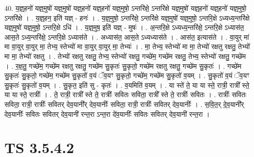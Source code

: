 \documentclass[17pt]{extarticle}
\begin{document}
40. य॒ज्ञ्॒हनो॑ यज्ञ्॒मुषो॑ यज्ञ्॒मुषो॑ यज्ञ्॒हनो॑ यज्ञ्॒हनो॑ यज्ञ्॒मुषो॒ ऽन्तरि॑क्षे॒ ऽन्तरि॑क्षे यज्ञ्॒मुषो॑ यज्ञ्॒हनो॑ यज्ञ्॒हनो॑ यज्ञ्॒मुषो॒ ऽन्तरि॑क्षे । . य॒ज्ञ्॒हन॒ इति॑ यज्ञ् - हनः॑ । . य॒ज्ञ्॒मुषो॒ ऽन्तरि॑क्षे॒ ऽन्तरि॑क्षे यज्ञ्॒मुषो॑ यज्ञ्॒मुषो॒ ऽन्तरि॒क्षे ऽध्यध्य॒न्तरि॑क्षे यज्ञ्॒मुषो॑ यज्ञ्॒मुषो॒ ऽन्तरि॒क्षे ऽधि॑ । . य॒ज्ञ्॒मुष॒ इति॑ यज्ञ् - मुषः॑ । . अ॒न्तरि॒क्षे ऽध्यध्य॒न्तरि॑क्षे॒ ऽन्तरि॒क्षे ऽध्यास॑त॒ आस॒ते ऽध्य॒न्तरि॑क्षे॒ ऽन्तरि॒क्षे ऽध्यास॑ते । . अध्यास॑त॒ आस॒ते ऽध्यध्यास॑ते । . आस॑त॒ इत्यास॑ते । . वा॒युर् मा॑ मा वा॒युर् वा॒युर् मा॒ तेभ्य॒ स्तेभ्यो॑ मा वा॒युर् वा॒युर् मा॒ तेभ्यः॑ । . मा॒ तेभ्य॒ स्तेभ्यो॑ मा मा॒ तेभ्यो॑ रक्षतु रक्षतु॒ तेभ्यो॑ मा मा॒ तेभ्यो॑ रक्षतु । . तेभ्यो॑ रक्षतु रक्षतु॒ तेभ्य॒ स्तेभ्यो॑ रक्षतु॒ गच्छे॑म॒ गच्छे॑म रक्षतु॒ तेभ्य॒ स्तेभ्यो॑ रक्षतु॒ गच्छे॑म । . र॒क्ष॒तु॒ गच्छे॑म॒ गच्छे॑म रक्षतु रक्षतु॒ गच्छे॑म सु॒कृतः॑ सु॒कृतो॒ गच्छे॑म रक्षतु रक्षतु॒ गच्छे॑म सु॒कृतः॑ । . गच्छे॑म सु॒कृतः॑ सु॒कृतो॒ गच्छे॑म॒ गच्छे॑म सु॒कृतो॑ व॒यं ॅव॒यꣳ सु॒कृतो॒ गच्छे॑म॒ गच्छे॑म सु॒कृतो॑ व॒यम् । . सु॒कृतो॑ व॒यं ॅव॒यꣳ सु॒कृतः॑ सु॒कृतो॑ व॒यम् । . सु॒कृत॒ इति॑ सु - कृतः॑ । . व॒यमिति॑ व॒यम् । . या स्ते॑ ते॒ या या स्ते॒ रात्री॒ रात्री᳚ स्ते॒ या या स्ते॒ रात्रीः᳚ । . ते॒ रात्री॒ रात्री᳚ स्ते ते॒ रात्रीः᳚ सवितः सविता॒ रात्री᳚ स्ते ते॒ रात्रीः᳚ सवितः । . रात्रीः᳚ सवितः सविता॒ रात्री॒ रात्रीः᳚ सवितर् देव॒यानी᳚र् देव॒यानीः᳚ सविता॒ रात्री॒ रात्रीः᳚ सवितर् देव॒यानीः᳚ । . स॒वि॒त॒र् दे॒व॒यानी᳚र् देव॒यानीः᳚ सवितः सवितर् देव॒यानी॑ रन्त॒रा ऽन्त॒रा दे॑व॒यानीः᳚ सवितः सवितर् देव॒यानी॑ रन्त॒रा । \newline
\pagebreak
{}

\section{ TS 3.5.4.2 }
\end{document}
